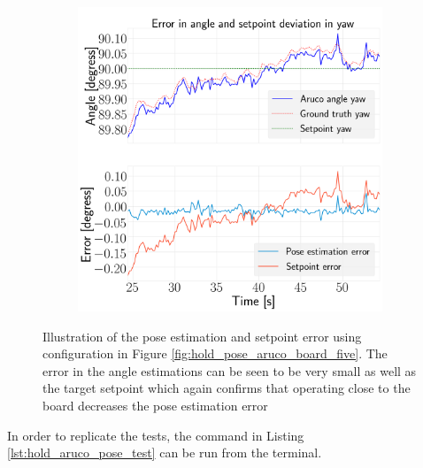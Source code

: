 \documentclass[../Head/report.tex]{subfiles}
\begin{document}
\begin{figure}[H]
\begin{subfigure}[t]{.30\textwidth}
        \caption{}
        \label{fig:hold_pose_estimation_test5_pitch}
    \end{subfigure}
     \hspace{0.2em}
    \begin{subfigure}[t]{.30\textwidth}
        \centering
        \includegraphics[width=\textwidth]{../Figures/hold_pose_using_aruco_pose_estimation/pose_error_yaw_test1.png}
        \caption{}
        \label{fig:hold_pose_estimation_test5_yaw}
    \end{subfigure}
    \caption{Illustration of the pose estimation and setpoint error using configuration in Figure \ref{fig:hold_pose_aruco_board_five}. The error in the angle estimations can be seen to be very small as well as the target setpoint which again confirms that operating close to the board decreases the pose estimation error}
    \label{fig:hold_pose_estimation_test5_error_angle}
\end{figure}

In order to replicate the tests, the command in Listing \ref{lst:hold_aruco_pose_test} can be run from the terminal.
\end{document}
